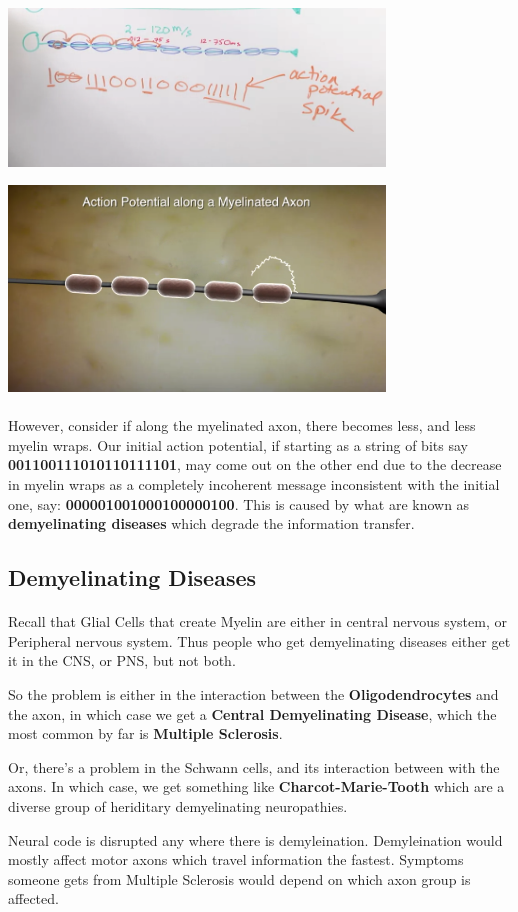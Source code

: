 \documentclass[12pt, a4paper]{article}
\begin{document}
{
    \centering
    \includegraphics[width=10cm]{myelinated_axon_whiteboard.png}

    \includegraphics[width=10cm]{action_potential_myelinated_axon_animated.png}
    
}

\paragraph*{}
However, consider if along the myelinated axon, there becomes less, and less myelin wraps.
Our initial action potential, if starting as a string of bits say \textbf{001100111010110111101}, may come out on the other end
due to the decrease in myelin wraps as a completely incoherent message inconsistent with the initial one, say: \textbf{000001001000100000100}.
This is caused by what are known as \textbf{demyelinating diseases} which degrade the information transfer.

\subsection{Demyelinating Diseases}
\paragraph*{}
Recall that Glial Cells that create Myelin are either in central nervous system, or Peripheral nervous system. Thus people
who get demyelinating diseases either get it in the CNS, or PNS, but not both.

So the problem is either in the interaction between the \textbf{Oligodendrocytes} and the axon,
in which case we get a \textbf{Central Demyelinating Disease}, which the most common by far is \textbf{Multiple Sclerosis}.

Or, there's a problem in the Schwann cells, and its interaction between with the axons. In which case,
we get something like \textbf{Charcot-Marie-Tooth} which are a diverse group of heriditary demyelinating neuropathies.

Neural code is disrupted any where there is demyleination. Demyleination would mostly affect
motor axons which travel information the fastest. Symptoms someone gets from Multiple Sclerosis would
depend on which axon group is affected.
\end{document}
